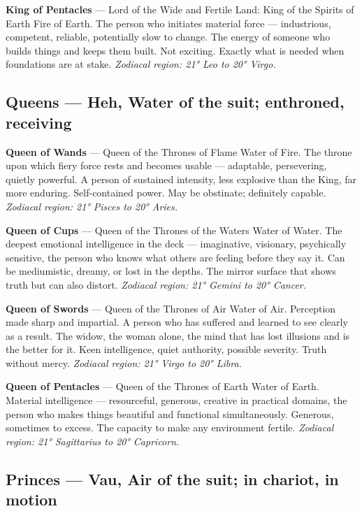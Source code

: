 \textbf{King of Pentacles} --- Lord of the Wide and Fertile Land: King of the Spirits of Earth Fire of Earth. The person who initiates material force --- industrious, competent, reliable, potentially slow to change. The energy of someone who builds things and keeps them built. Not exciting. Exactly what is needed when foundations are at stake. \emph{Zodiacal region: 21° Leo to 20° Virgo.}

\subsection{Queens --- Heh, Water of the suit; enthroned, receiving}\label{queens--heh-water-of-the-suit-enthroned-receiving}

\textbf{Queen of Wands} --- Queen of the Thrones of Flame Water of Fire. The throne upon which fiery force rests and becomes usable --- adaptable, persevering, quietly powerful. A person of sustained intensity, less explosive than the King, far more enduring. Self-contained power. May be obstinate; definitely capable. \emph{Zodiacal region: 21° Pisces to 20° Aries.}

\textbf{Queen of Cups} --- Queen of the Thrones of the Waters Water of Water. The deepest emotional intelligence in the deck --- imaginative, visionary, psychically sensitive, the person who knows what others are feeling before they say it. Can be mediumistic, dreamy, or lost in the depths. The mirror surface that shows truth but can also distort. \emph{Zodiacal region: 21° Gemini to 20° Cancer.}

\textbf{Queen of Swords} --- Queen of the Thrones of Air Water of Air. Perception made sharp and impartial. A person who has suffered and learned to see clearly as a result. The widow, the woman alone, the mind that has lost illusions and is the better for it. Keen intelligence, quiet authority, possible severity. Truth without mercy. \emph{Zodiacal region: 21° Virgo to 20° Libra.}

\textbf{Queen of Pentacles} --- Queen of the Thrones of Earth Water of Earth. Material intelligence --- resourceful, generous, creative in practical domains, the person who makes things beautiful and functional simultaneously. Generous, sometimes to excess. The capacity to make any environment fertile. \emph{Zodiacal region: 21° Sagittarius to 20° Capricorn.}

\subsection{Princes --- Vau, Air of the suit; in chariot, in motion}\label{princes--vau-air-of-the-suit-in-chariot-in-motion}

